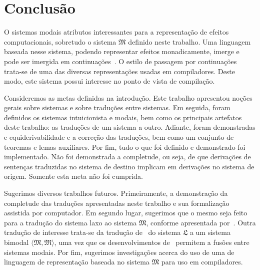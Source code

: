 \chapter{Conclusão}
    O sistemas modais atributos interessantes para a representação de efeitos computacionais, sobretudo o sistema $\mathfrak{M}$ definido neste trabalho.
    Uma linguagem baseada nesse sistema, podendo representar efeitos monadicamente, imerge e pode ser imergida em continuações~\citep{Filinski.1994}.
    O estilo de passagem por continuações trata-se de uma das diversas representações usadas em compiladores.
    Deste modo, este sistema possui interesse no ponto de vista de compilação.

    \vspace{.3\baselineskip}
    Consideremos as metas definidas na introdução.
    Este trabalho apresentou noções gerais sobre sistemas e sobre traduções entre sistemas.
    Em seguida, foram definidos os sistemas intuicionista e modais, bem como os principais artefatos deste trabalho: as traduções de um sistema a outro.
    Adiante, foram demonstradas e equiderivabilidade e a correção das traduções, bem como um conjunto de teoremas e lemas auxiliares.
    Por fim, tudo o que foi definido e demonstrado foi implementado.
    Não foi demonstrada a completude, ou seja, de que derivações de sentenças traduzidas no sistema de destino implicam em derivações no sistema de origem.
    Somente esta meta não foi cumprida.

    \vspace{.3\baselineskip}
    Sugerimos diversos trabalhos futuros. Primeiramente, a demonstração da completude das traduções apresentadas neste trabalho e sua formalização assistida por computador.
    Em segundo lugar, sugerimos que o mesmo seja feito para a tradução do sistema laxo ao sistema $\mathfrak{M}$, conforme apresentada por~\cite{Fairtlough}. 
    Outra tradução de interesse trata-se da tradução de~\cite{Fairtlough} do sistema $\mathfrak{L}$ a um sistema bimodal $\langle\mathfrak{M},\mathfrak{M}\rangle$, uma vez que os desenvolvimentos de~\cite{Nunes} permitem a fusões entre sistemas modais.
    Por fim, sugerimos investigações acerca do uso de uma de linguagem de representação baseada no sistema $\mathfrak{M}$ para uso em compiladores.

